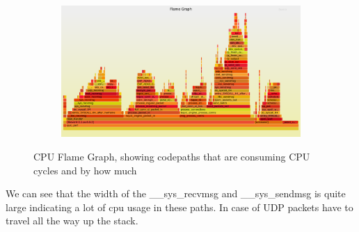 \begin{frame}

\begin{figure}[!htb]
    \centering
    \begin{subfigure}{0.8\textwidth}
        \includegraphics[width=\linewidth]{./plots/perf_flame_graphs/quic/kernel.png}
    \end{subfigure}
    
    \caption{CPU Flame Graph, showing codepaths that are consuming CPU cycles and by how much}\label{fig:cpu-flame-graph-}
\end{figure}
We can see that the width of the \_\_sys\_recvmsg and \_\_sys\_sendmsg is quite large indicating a lot of cpu usage in these paths. In case of UDP packets have to travel all the way up the stack.
\end{frame}
\clearpage

%

